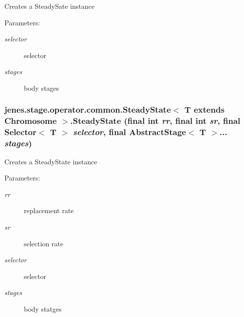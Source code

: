 Creates a SteadySate instance

\begin{Desc}
\item[Parameters:]
\begin{description}
\item[{\em selector}]selector \item[{\em stages}]body stages \end{description}
\end{Desc}
\hypertarget{classjenes_1_1stage_1_1operator_1_1common_1_1_steady_state_3_01_t_01extends_01_chromosome_01_4_3411aeb67d5f0914fdb6682627a507c9}{
\subsubsection[SteadyState]{\setlength{\rightskip}{0pt plus 5cm}jenes.stage.operator.common.SteadyState$<$ T extends Chromosome $>$.SteadyState (final int {\em rr}, \/  final int {\em sr}, \/  final Selector$<$ T $>$ {\em selector}, \/  final AbstractStage$<$ T $>$... {\em stages})}}
\label{classjenes_1_1stage_1_1operator_1_1common_1_1_steady_state_3_01_t_01extends_01_chromosome_01_4_3411aeb67d5f0914fdb6682627a507c9}


Creates a SteadyState instance

\begin{Desc}
\item[Parameters:]
\begin{description}
\item[{\em rr}]replacement rate \item[{\em sr}]selection rate \item[{\em selector}]selector \item[{\em stages}]body statges \end{description}
\end{Desc}


